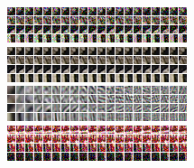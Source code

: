 \documentclass[10pt, journal, twocolumn, final, a4paper]{IEEEtran}
\begin{document}
\begin{figure}[htpb!]
	\centering
	\includegraphics[width = \columnwidth]{figs/patch_groups/patch_group_bus_045_085_012_s40_wx37_wt2_sx9_st4_r040_n200_nisy.png}\\
	\vspace{.2cm}
	\includegraphics[width = \columnwidth]{figs/patch_groups/patch_group_bus_045_085_012_s40_wx37_wt2_sx9_st4_r040_n200_orig.png}\\
	\vspace{.2cm}
	\includegraphics[width = \columnwidth]{figs/patch_groups/patch_group_bus_045_085_012_s40_wx37_wt2_sx9_st4_r040_n200_pcas.png}\\
	\vspace{.2cm}
	\includegraphics[width = \columnwidth]{figs/patch_groups/patch_group_bus_255_056_010_s40_wx37_wt2_sx9_st4_r040_n200_nisy.png}\\
	\vspace{.2cm}

\end{figure}
\end{document}
